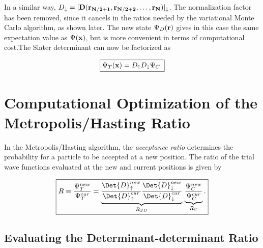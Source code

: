 In a similar way, $D_\downarrow = |{\bf D}({\bf r_{N/2+1}}, {\bf r_{N/2+2}},\ldots,{\bf r_{N}})|_{\downarrow}$. The normalization factor has been removed, since it cancels in the ratios needed by the variational Monte Carlo algorithm, as shown later. The new state $\Psi_D({\bf r})$ gives in this case the same expectation value as $\Psi({\bf x})$, but is more convenient in terms of computational cost.The Slater determinant  can now be factorized as

\begin{equation}\label{detDetJas}
 \boxed{\Psi_T({\bf x})  = D_\uparrow D_\downarrow \Psi_C.}
\end{equation}


\section{Computational Optimization of the Metropolis/Hasting Ratio}\label{psi_psi_ratio}

In the Metropolis/Hasting algorithm, the \emph{acceptance ratio} determines the probability for a particle to be accepted at a new position. The ratio of the trial wave functions evaluated at the new and current positions is given by

\begin{equation}\label{acceptanceRatio}
\boxed{R \equiv \frac{\Psi_{T}^{new}}{\Psi_{T}^{cur}} = \underbrace{\frac{\Det{D}_{\uparrow}^{new}}{\Det{D}_{\uparrow}^{cur}} \frac{\Det{D}_{\downarrow}^{new}}{\Det{D}_{\downarrow}^{cur}}}_{R_{SD}}\, \underbrace{\frac{\Psi_{C}^{new}}{\Psi_{C}^{cur}}}_{R_{C}}.}
\end{equation}


\subsection{Evaluating the Determinant-determinant Ratio}

